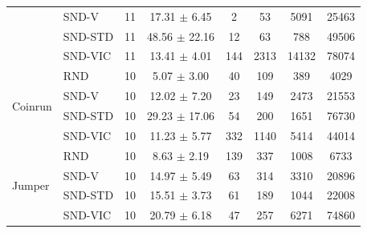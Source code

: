 \documentclass[a4paper,11pt]{elsarticle}
\begin{document}
\begin{table}[t!]
\begin{tabular}{l|l|cccccc}
& \multicolumn{1}{l|}{SND-V} & \multicolumn{1}{c}{11} & \multicolumn{1}{c}{17.31 $\pm$ 6.45} & \multicolumn{1}{c}{2} & \multicolumn{1}{c}{53} & \multicolumn{1}{c}{5091} & \multicolumn{1}{c}{25463} \\
& \multicolumn{1}{l|}{SND-STD} & \multicolumn{1}{c}{11} & \multicolumn{1}{c}{48.56 $\pm$ 22.16} & \multicolumn{1}{c}{12} & \multicolumn{1}{c}{63} & \multicolumn{1}{c}{788} & \multicolumn{1}{c}{49506} \\
& \multicolumn{1}{l|}{SND-VIC} & \multicolumn{1}{c}{11} & \multicolumn{1}{c}{13.41 $\pm$ 4.01} & \multicolumn{1}{c}{144} & \multicolumn{1}{c}{2313} & \multicolumn{1}{c}{14132} & \multicolumn{1}{c}{78074} \\
\hline%
\multirow{4}{*}{Coinrun}
& \multicolumn{1}{l|}{RND} & \multicolumn{1}{c}{10} & \multicolumn{1}{c}{5.07 $\pm$ 3.00} & \multicolumn{1}{c}{40} & \multicolumn{1}{c}{109} & \multicolumn{1}{c}{389} & \multicolumn{1}{c}{4029} \\
& \multicolumn{1}{l|}{SND-V} & \multicolumn{1}{c}{10} & \multicolumn{1}{c}{12.02 $\pm$ 7.20} & \multicolumn{1}{c}{23} & \multicolumn{1}{c}{149} & \multicolumn{1}{c}{2473} & \multicolumn{1}{c}{21553} \\
& \multicolumn{1}{l|}{SND-STD} & \multicolumn{1}{c}{10} & \multicolumn{1}{c}{29.23 $\pm$ 17.06} & \multicolumn{1}{c}{54} & \multicolumn{1}{c}{200} & \multicolumn{1}{c}{1651} & \multicolumn{1}{c}{76730} \\
& \multicolumn{1}{l|}{SND-VIC} & \multicolumn{1}{c}{10} & \multicolumn{1}{c}{11.23 $\pm$ 5.77} & \multicolumn{1}{c}{332} & \multicolumn{1}{c}{1140} & \multicolumn{1}{c}{5414} & \multicolumn{1}{c}{44014} \\
\hline%
\multirow{4}{*}{Jumper}
& \multicolumn{1}{l|}{RND} & \multicolumn{1}{c}{10} & \multicolumn{1}{c}{8.63 $\pm$ 2.19} & \multicolumn{1}{c}{139} & \multicolumn{1}{c}{337} & \multicolumn{1}{c}{1008} & \multicolumn{1}{c}{6733} \\
& \multicolumn{1}{l|}{SND-V} & \multicolumn{1}{c}{10} & \multicolumn{1}{c}{14.97 $\pm$ 5.49} & \multicolumn{1}{c}{63} & \multicolumn{1}{c}{314} & \multicolumn{1}{c}{3310} & \multicolumn{1}{c}{20896} \\
& \multicolumn{1}{l|}{SND-STD} & \multicolumn{1}{c}{10} & \multicolumn{1}{c}{15.51 $\pm$ 3.73} & \multicolumn{1}{c}{61} & \multicolumn{1}{c}{189} & \multicolumn{1}{c}{1044} & \multicolumn{1}{c}{22008} \\
& \multicolumn{1}{l|}{SND-VIC} & \multicolumn{1}{c}{10} & \multicolumn{1}{c}{20.79 $\pm$ 6.18} & \multicolumn{1}{c}{47} & \multicolumn{1}{c}{257} & \multicolumn{1}{c}{6271} & \multicolumn{1}{c}{74860} \\
\hline\hline
\end{tabular}
\label{tab:analysis1}
\end{table}
\end{document}
